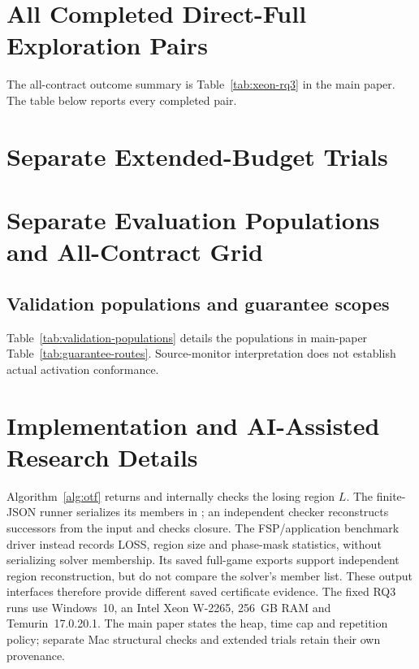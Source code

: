 \documentclass[11pt]{article}
\begin{document}
\FloatBarrier
{}
\section{All Completed Direct-Full Exploration Pairs}\label{ta:workload_rows}
The all-contract outcome summary is Table~\ref{tab:xeon-rq3} in the main paper. The table below reports every completed pair.



\FloatBarrier

\FloatBarrier
{}
\section{Separate Extended-Budget Trials}\label{ta:extended_budget}

\FloatBarrier

\FloatBarrier
{}
\section{Separate Evaluation Populations and All-Contract Grid}
\label{ta:additional_populations}
\subsection{Validation populations and guarantee scopes}\label{ta:validation_scope}
Table~\ref{tab:validation-populations} details the populations in main-paper Table~\ref{tab:guarantee-routes}. Source-monitor interpretation does not establish actual activation conformance.

\FloatBarrier




\section{Implementation and AI-Assisted Research Details}\label{ta:implementation_details}
Algorithm~\ref{alg:otf} returns and internally checks the losing region $L$. The finite-JSON runner serializes its members in ; an independent checker reconstructs successors from the input and checks closure. The FSP/application benchmark driver instead records LOSS, region size and phase-mask statistics, without serializing solver membership. Its saved full-game exports support independent region reconstruction, but do not compare the solver's member list. These output interfaces therefore provide different saved certificate evidence.
The fixed RQ3 runs use Windows~10, an Intel Xeon W-2265, 256~GB RAM and Temurin~17.0.20.1. The main paper states the heap, time cap and repetition policy; separate Mac structural checks and extended trials retain their own provenance.
\end{document}
